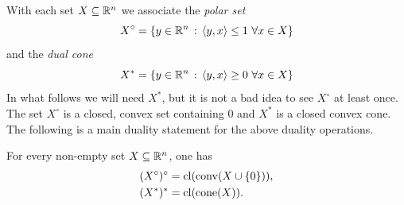 With each set $X \subseteq \mathbb{R}^n$ we associate the \emph{polar set}
\[
	X^\circ = \left\{ y \in \mathbb{R}^n \,:\, \left\langle y , x \right\rangle \le 1 \ \forall x \in X \right\}
\]
and the \emph{dual cone}
\[
	X^\ast = \left\{ y \in \mathbb{R}^n \,:\, \left\langle y , x \right\rangle \ge 0 \ \forall x \in X \right\}
\]
In what follows we will need $X^\ast$, but it is not a bad idea to see $X^\circ$ at least once. The set $X^\circ$ is a closed, convex set containing $0$ and $X^\ast$ is a closed convex cone. The following is a main duality statement for the above duality operations. 
\begin{proposition}
	For every non-empty set $X \subseteq \mathbb{R}^n$, one has
	\begin{align*}
		(X^\circ)^\circ & = \operatorname{cl}(\operatorname{conv}(X \cup \{0\})),
		\\ (X^\ast)^\ast & = \operatorname{cl}(\operatorname{cone}(X)).
	\end{align*}
\end{proposition}
